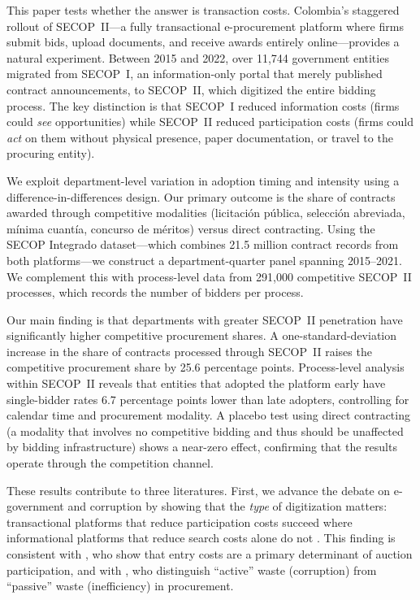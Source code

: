 \documentclass[12pt]{article}
\begin{document}
This paper tests whether the answer is transaction costs. Colombia's staggered rollout of SECOP~II---a fully transactional e-procurement platform where firms submit bids, upload documents, and receive awards entirely online---provides a natural experiment. Between 2015 and 2022, over 11,744 government entities migrated from SECOP~I, an information-only portal that merely published contract announcements, to SECOP~II, which digitized the entire bidding process. The key distinction is that SECOP~I reduced information costs (firms could \textit{see} opportunities) while SECOP~II reduced participation costs (firms could \textit{act} on them without physical presence, paper documentation, or travel to the procuring entity).

We exploit department-level variation in adoption timing and intensity using a difference-in-differences design. Our primary outcome is the share of contracts awarded through competitive modalities (licitaci\'{o}n p\'{u}blica, selecci\'{o}n abreviada, m\'{i}nima cuant\'{i}a, concurso de m\'{e}ritos) versus direct contracting. Using the SECOP Integrado dataset---which combines 21.5 million contract records from both platforms---we construct a department-quarter panel spanning 2015--2021. We complement this with process-level data from 291,000 competitive SECOP~II processes, which records the number of bidders per process.

Our main finding is that departments with greater SECOP~II penetration have significantly higher competitive procurement shares. A one-standard-deviation increase in the share of contracts processed through SECOP~II raises the competitive procurement share by 25.6 percentage points. Process-level analysis within SECOP~II reveals that entities that adopted the platform early have single-bidder rates 6.7 percentage points lower than late adopters, controlling for calendar time and procurement modality. A placebo test using direct contracting (a modality that involves no competitive bidding and thus should be unaffected by bidding infrastructure) shows a near-zero effect, confirming that the results operate through the competition channel.

These results contribute to three literatures. First, we advance the debate on e-government and corruption by showing that the \textit{type} of digitization matters: transactional platforms that reduce participation costs succeed where informational platforms that reduce search costs alone do not \citep{lewis2016, bosio2022}. This finding is consistent with \citet{krasnokutskaya2011}, who show that entry costs are a primary determinant of auction participation, and with \citet{bandiera2009}, who distinguish ``active'' waste (corruption) from ``passive'' waste (inefficiency) in procurement.
\end{document}
